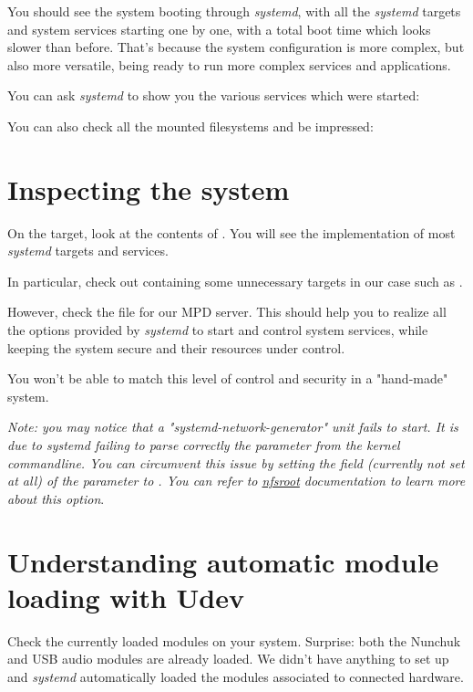 You should see the system booting through {\em systemd}, with all the
{\em systemd} targets and system services starting one by one, with a
total boot time which looks slower than before. That's because the
system configuration is more complex, but also more versatile, being
ready to run more complex services and applications.

You can ask {\em systemd} to show you the various services which were
started:


You can also check all the mounted filesystems and be impressed:


\section{Inspecting the system}

On the target, look at the contents of . You will
see the implementation of most {\em systemd} targets and services.

In particular, check out  containing
some unnecessary targets in our case such as .

However, check the  file for our MPD server.
This should help you to realize all the options provided
by {\em systemd} to start and control system services, while
keeping the system secure and their resources under control.

You won't be able to match this level of control and security in a
"hand-made" system.

\textit{Note: you may notice that a "systemd-network-generator" unit fails to
start. It is due to systemd failing to parse correctly the 
parameter from the kernel commandline. You can circumvent this issue by
setting the  field (currently not set at all) of the
 parameter to . You can refer to
\href{https://www.kernel.org/doc/Documentation/filesystems/nfs/nfsroot.txt}{nfsroot}
documentation to learn more about this option}.

\section{Understanding automatic module loading with Udev}

Check the currently loaded modules on your system. Surprise: both
the Nunchuk and USB audio modules are already loaded.
We didn't have anything to set up and {\em systemd} automatically loaded
the modules associated to connected hardware.

